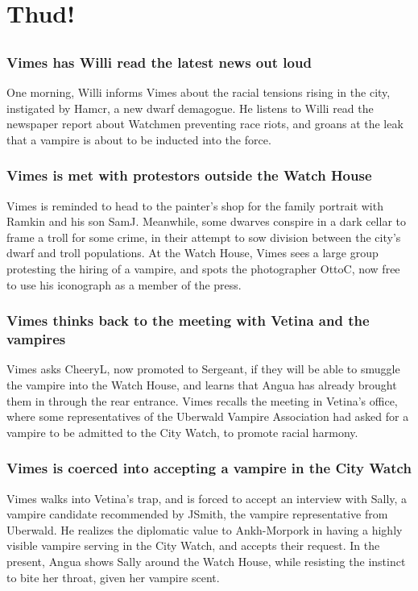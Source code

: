 \section{Thud!}


\subsection{}
\subsubsection{\Gls{Vimes} has \Gls{Willi} read the latest news out loud}
One morning, \Gls{Willi} informs \Gls{Vimes} about the racial tensions rising in the city,
instigated by \Gls{Hamcr}, a new dwarf demagogue. He listens to \Gls{Willi} read the newspaper
report about Watchmen preventing race riots, and groans at the leak that a vampire is about to be
inducted into the force.

\subsubsection{\Gls{Vimes} is met with protestors outside the Watch House}
\Gls{Vimes} is reminded to head to the painter's shop for the family portrait with \Gls{Ramkin}
and his son \Gls{SamJ}. Meanwhile, some dwarves conspire in a dark cellar to frame a troll for some
crime, in their attempt to sow division between the city's dwarf and troll populations. At the
Watch House, \Gls{Vimes} sees a large group protesting the hiring of a vampire, and spots the
photographer \Gls{OttoC}, now free to use his iconograph as a member of the press.

\subsubsection{\Gls{Vimes} thinks back to the meeting with \Gls{Vetina} and the vampires}
\Gls{Vimes} asks \Gls{CheeryL}, now promoted to Sergeant, if they will be able to smuggle the
vampire into the Watch House, and learns that \Gls{Angua} has already brought them in through the
rear entrance. \Gls{Vimes} recalls the meeting in \Gls{Vetina}'s office, where some representatives
of the Uberwald Vampire Association had asked for a vampire to be admitted to the City Watch, to
promote racial harmony.

\subsubsection{\Gls{Vimes} is coerced into accepting a vampire in the City Watch}
\Gls{Vimes} walks into \Gls{Vetina}'s trap, and is forced to accept an interview with \Gls{Sally},
a vampire candidate recommended by \Gls{JSmith}, the vampire representative from Uberwald. He
realizes the diplomatic value to Ankh-Morpork in having a highly visible vampire serving in the
City Watch, and accepts their request. In the present, \Gls{Angua} shows \Gls{Sally} around the
Watch House, while resisting the instinct to bite her throat, given her vampire scent.


